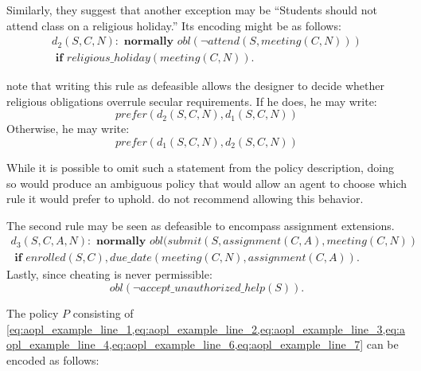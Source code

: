 Similarly, they suggest that another exception may be ``Students should not attend class on a religious holiday.''
Its encoding might be as follows:
\begin{multline}
    \label{eq:aopl_example_line_3}
    d_2(S,C,N): \textbf{ normally } obl(\neg attend(S, meeting(C, N))) \\
        \textbf{ if } religious\_holiday(meeting(C, N)).
\end{multline}

\citet{gelfond_authorization_2008} note that writing this rule as defeasible allows the designer to decide whether religious obligations overrule secular requirements.
If he does, he may write:
\begin{equation}
    \label{eq:aopl_example_line_4}
    prefer(d_2(S,C,N),d_1(S,C,N))
\end{equation}
Otherwise, he may write:
\begin{equation}
    \label{eq:aopl_example_line_5}
    prefer(d_1(S,C,N), d_2(S,C,N))
\end{equation}

While it is possible to omit such a statement from the policy description, doing so would produce an ambiguous policy that would allow an agent to choose which rule it would prefer to uphold.
\citet{gelfond_authorization_2008} do not recommend allowing this behavior.

The second rule may be seen as defeasible to encompass assignment extensions.
\begin{multline}
    \label{eq:aopl_example_line_6}
    d_3(S,C,A,N): \textbf{ normally } obl(submit(S,assignment(C,A),meeting(C,N)) \\ \textbf{ if } enrolled(S,C), due\_date(meeting(C,N), assignment(C,A)).
\end{multline}
Lastly, since cheating is never permissible:
\begin{equation}
    \label{eq:aopl_example_line_7}
    obl(\neg accept\_unauthorized\_help(S)).
\end{equation}

The policy $P$ consisting of \cref{eq:aopl_example_line_1,eq:aopl_example_line_2,eq:aopl_example_line_3,eq:aopl_example_line_4,eq:aopl_example_line_6,eq:aopl_example_line_7} can be encoded as follows:


